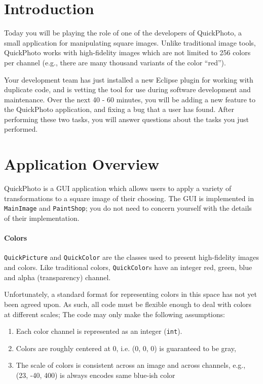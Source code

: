 \documentclass[12pt]{article}
\begin{document}
\maketitle

\section{Introduction}
Today you will be playing the role of one of the developers of
QuickPhoto, a small application for manipulating square images. Unlike
traditional image tools, QuickPhoto works with high-fidelity images
which are not limited to 256 colors per channel (e.g., there are many
thousand variants of the color ``red'').

Your
development team has just installed a new Eclipse plugin for working
with duplicate code, and is vetting the tool for use during software
development and maintenance. 
Over the next 40 - 60 minutes, you will be adding a new feature to the
QuickPhoto application, and fixing a bug that a user has found. After
performing these two tasks, you will answer questions about the tasks
you just performed.

\section{Application Overview}
QuickPhoto is a GUI application which allows users to apply a variety
of transformations to a square image of their choosing. The GUI is
implemented in \verb|MainImage| and \verb|PaintShop|; you do not need
to concern yourself with the details of their implementation.

\paragraph{Colors}
\verb|QuickPicture| and \verb|QuickColor| are the classes used to
present high-fidelity images and colors.  Like traditional colors,
\verb|QuickColor|s have an integer red, green, blue and alpha
(transparency) channel.

Unfortunately, a standard format for representing colors in this space
has not yet been agreed upon.  As such, all code must be flexible
enough to deal with colors at different scales; The code may only make
the following assumptions:

\begin{enumerate}
\item Each color channel is represented as an integer (\verb|int|).
\item Colors are roughly centered at 0, i.e. (0, 0, 0) is guaranteed
  to be gray,
\item The scale of colors is consistent across an image and across
  channels, e.g., (23, -40, 400) is always encodes same blue-ish color
\end{enumerate}
\end{document}
